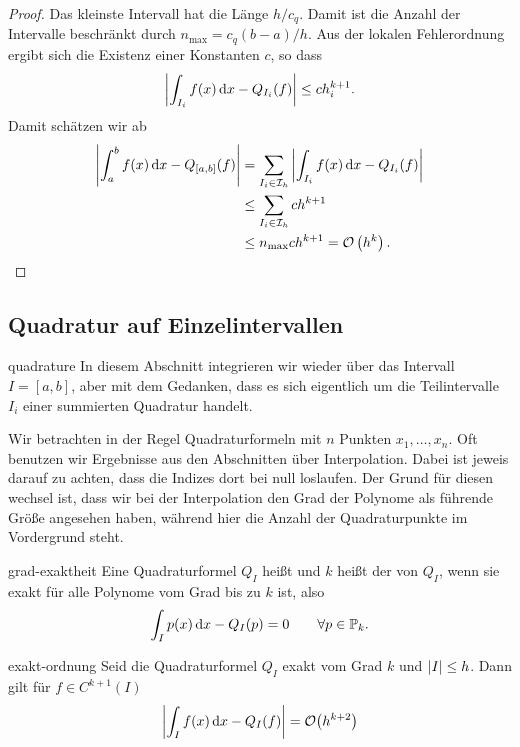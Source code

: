 \begin{proof}
  Das kleinste Intervall hat die Länge $h/c_q$. Damit ist die Anzahl
  der Intervalle beschränkt durch $n_{\max}=c_q (b-a)/h$. Aus der
  lokalen Fehlerordnung ergibt sich die Existenz einer Konstanten $c$,
  so dass
  \begin{gather}
    \left|\int_{I_i} f(x)\,\mathrm{d} x - Q_{I_i}(f)\right| \le c h_i^{k+1}.
  \end{gather}
  Damit schätzen wir ab
  \begin{align}
    \left|\int_a^b f(x)\,\mathrm{d} x - Q_{[a,b]}(f)\right|
    &= \sum_{I_i\in\mathcal I_h}  \left|\int_{I_i} f(x)\,\mathrm{d} x - Q_{I_i}(f)\right|\\
    &\le \sum_{I_i\in\mathcal I_h} c h^{k+1}\\
    & \le n_{\max} c h^{k+1} = \mathcal O\left(h^{k}\right).
  \end{align}
\end{proof}

\subsection{Quadratur auf Einzelintervallen}

\begin{Notation}{quadrature}
  In diesem Abschnitt integrieren wir wieder über das Intervall
  $I=[a,b]$, aber mit dem Gedanken, dass es sich eigentlich um die
  Teilintervalle $I_i$ einer summierten Quadratur handelt.

  Wir betrachten in der Regel Quadraturformeln mit $n$ Punkten
  $x_1,\dots,x_n$. Oft benutzen wir Ergebnisse aus den Abschnitten
  über Interpolation. Dabei ist jeweis darauf zu achten, dass die
  Indizes dort bei null loslaufen. Der Grund für diesen wechsel ist,
  dass wir bei der Interpolation den Grad der Polynome als führende
  Größe angesehen haben, während hier die Anzahl der Quadraturpunkte
  im Vordergrund steht.
\end{Notation}

\begin{Definition}{grad-exaktheit}
  Eine Quadraturformel $Q_I$ heißt  und $k$
  heißt der  von $Q_I$, wenn sie exakt für
  alle Polynome vom Grad bis zu $k$ ist, also
  \begin{gather}
    \int_I p(x)\,\mathrm{d} x - Q_{I}(p) = 0 \qquad \forall p\in \mathbb P_k.
  \end{gather}
\end{Definition}

\begin{Lemma}{exakt-ordnung}
  Seid die Quadraturformel $Q_I$ exakt vom Grad $k$ und
  $\lvert I\rvert \le h$. Dann gilt für $f\in C^{k+1}(I)$
  \begin{gather}
    \left|\int_{I} f(x)\,\mathrm{d} x - Q_{I}(f)\right| = \mathcal O\bigl(h^{k+2}\bigr)
  \end{gather}
\end{Lemma}

